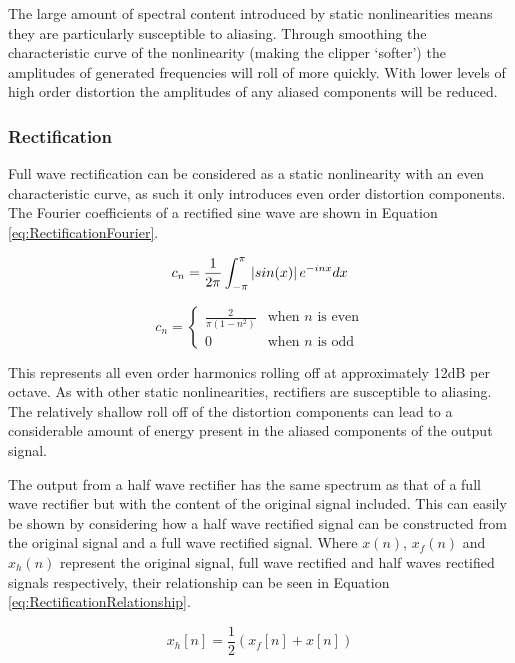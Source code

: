 			The large amount of spectral content introduced by static nonlinearities means they are
			particularly susceptible to aliasing. Through smoothing the characteristic curve of the
			nonlinearity (making the clipper `softer') the amplitudes of generated frequencies will roll of
			more quickly. With lower levels of high order distortion the amplitudes of any aliased components
			will be reduced.

		\subsubsection*{Rectification}
			Full wave rectification can be considered as a static nonlinearity with an even characteristic
			curve, as such it only introduces even order distortion components. The Fourier coefficients of a
			rectified sine wave are shown in Equation \ref{eq:RectificationFourier}.

			\[ c_{n} = \frac{1}{2\pi} \int_{-\pi}^{\pi} \left|sin(x)\right|e^{-inx} dx \]

			\begin{equation}
				c_{n} = \begin{cases}
					\frac{2}{\pi(1 - n^{2})} & \text{when $n$ is even} \\
					0 & \text{when $n$ is odd}
				\end{cases}
				\label{eq:RectificationFourier}
			\end{equation}

			This represents all even order harmonics rolling off at approximately 12dB per octave.  As with
			other static nonlinearities, rectifiers are susceptible to aliasing. The relatively shallow roll
			off of the distortion components can lead to a considerable amount of energy present in the aliased
			components of the output signal. 

			The output from a half wave rectifier has the same spectrum as that of a full wave rectifier
			but with the content of the original signal included. This can easily be shown by considering how a
			half wave rectified signal can be constructed from the original signal and a full wave rectified
			signal. Where $x(n)$, $x_{f}(n)$ and $x_{h}(n)$ represent the original signal, full wave rectified
			and half waves rectified signals respectively, their relationship can be seen in Equation
			\ref{eq:RectificationRelationship}.

			\begin{equation}
				x_{h}[n] = \frac{1}{2} \left( x_{f}[n] + x[n] \right)
				\label{eq:RectificationRelationship}
			\end{equation}

